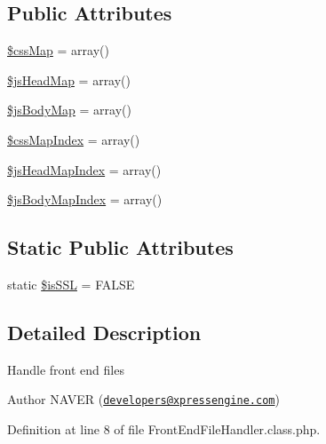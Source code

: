 \subsection*{Public Attributes}
\begin{DoxyCompactItemize}
\item 
\hyperlink{classFrontEndFileHandler_ae7470e6b48cdd0b76b8bd0fd8e38850c}{\$css\+Map} = array()
\item 
\hyperlink{classFrontEndFileHandler_ab434f9c8c874aaf8186e259dff95d116}{\$js\+Head\+Map} = array()
\item 
\hyperlink{classFrontEndFileHandler_ad03de614a088bc386c393543a3cd9aed}{\$js\+Body\+Map} = array()
\item 
\hyperlink{classFrontEndFileHandler_a61df1d725cd1884fd0a260dec738a4b7}{\$css\+Map\+Index} = array()
\item 
\hyperlink{classFrontEndFileHandler_a151a55b31ffaec411a86b7f618eed4ac}{\$js\+Head\+Map\+Index} = array()
\item 
\hyperlink{classFrontEndFileHandler_aba61415d3f993f1f6b9cddc0024f50b1}{\$js\+Body\+Map\+Index} = array()
\end{DoxyCompactItemize}
\subsection*{Static Public Attributes}
\begin{DoxyCompactItemize}
\item 
static \hyperlink{classFrontEndFileHandler_a1e709934ab4023d10850268064d771bc}{\$is\+S\+S\+L} = F\+A\+L\+S\+E
\end{DoxyCompactItemize}


\subsection{Detailed Description}
Handle front end files \begin{DoxyAuthor}{Author}
N\+A\+V\+E\+R (\href{mailto:developers@xpressengine.com}{\tt developers@xpressengine.\+com}) 
\end{DoxyAuthor}


Definition at line 8 of file Front\+End\+File\+Handler.\+class.\+php.



